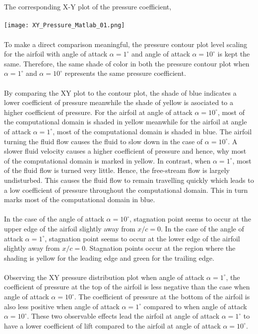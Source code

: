 \documentclass[a4paper, 12pt]{report}
\def\a{\alpha}
\def\size{0.90}
\begin{document}
\begin{center}
\\~\\The corresponding X-Y plot of the pressure coefficient,
\\~\\\texttt{[image: XY\_Pressure\_Matlab\_01.png]}
\\~\\To make a direct comparison meaningful, the pressure contour plot level scaling for the airfoil with angle of attack $\a=1^{\circ}$ and angle of attack $\a=10^{\circ}$ is kept the same. Therefore, the same shade of color in both the pressure contour plot when $\a=1^\circ$ and $\a=10^\circ$ represents the same pressure coefficient. 
\\~\\By comparing the XY plot to the contour plot, the shade of blue indicates a lower coefficient of pressure meanwhile the shade of yellow is asociated to a higher coefficient of pressure. For the airfoil at angle of attack $\a=10^\circ$, most of the computational domain is shaded in yellow meanwhile for the airfoil at angle of attack $\a=1^\circ$, most of the computational domain is shaded in blue. The airfoil turning the fluid flow causes the fluid to slow down in the case of $\a=10^\circ$. A slower fluid velocity causes a higher coefficient of pressure and hence, why most of the computational domain is marked in yellow. In contrast, when $\a=1^\circ$, most of the fluid flow is turned very little. Hence, the free-stream flow is largely undisturbed. This causes the fluid flow to remain travelling quickly which leads to a low coefficient of pressure throughout the computational domain. This in turn marks most of the computational domain in blue.
\\~\\In the case of the angle of attack $\a=10^\circ$, stagnation point seems to occur at the upper edge of the airfoil slightly away from $x/c=0$. In the case of the angle of attack $\a=1^\circ$, stagnation point seems to occur at the lower edge of the airfoil slightly away from $x/c=0$. Stagnation points occur at the region where the shading is yellow for the leading edge and green for the trailing edge. 
\\~\\Observing the XY pressure distribution plot when angle of attack $\a=1^\circ$, the coefficient of pressure at the top of the airfoil is less negative than the case when angle of attack $\a=10^\circ$. The coefficient of pressure at the bottom of the airfoil is also less positive when angle of attack $\a=1^\circ$ compared to when angle of attack $\a=10^\circ$. These two observable effects lead the airfoil at angle of attack $\a=1^\circ$ to have a lower coefficient of lift compared to the airfoil at angle of attack $\a=10^\circ$.

\end{center}
\end{document}
